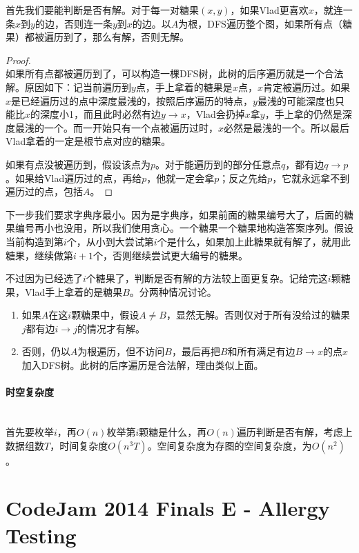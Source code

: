 \documentclass[UTF8]{ctexart}
\newcommand{\myparagraph}[1]{\paragraph{#1}\mbox{}\\}
\theoremstyle{nonumberplain}
\newtheorem{proof}{\hspace{1em}证明：}
\begin{document}
			首先我们要能判断是否有解。对于每一对糖果$(x,y)$，如果Vlad更喜欢$x$，就连一条$x$到$y$的边，否则连一条$y$到$x$的边。以$A$为根，DFS遍历整个图，如果所有点（糖果）都被遍历到了，那么有解，否则无解。
			
			\begin{proof}\mbox{}\\
			
				如果所有点都被遍历到了，可以构造一棵DFS树，此树的后序遍历就是一个合法解。原因如下：记当前遍历到$y$点，手上拿着的糖果是$x$点，$x$肯定被遍历过。如果$x$是已经遍历过的点中深度最浅的，按照后序遍历的特点，$y$最浅的可能深度也只能比$x$的深度小1，而且此时必然有边$y \to x$，Vlad会扔掉$x$拿$y$，手上拿的仍然是深度最浅的一个。而一开始只有一个点被遍历过时，$x$必然是最浅的一个。所以最后Vlad拿着的一定是根节点对应的糖果。
				
				如果有点没被遍历到，假设该点为$p$。对于能遍历到的部分任意点$q$，都有边$q \to p$。如果给Vlad遍历过的点，再给$p$，他就一定会拿$p$；反之先给$p$，它就永远拿不到遍历过的点，包括$A$。
				
			\end{proof}
			
			下一步我们要求字典序最小。因为是字典序，如果前面的糖果编号大了，后面的糖果编号再小也没用，所以我们使用贪心。一个糖果一个糖果地构造答案序列。假设当前构造到第$i$个，从小到大尝试第$i$个是什么，如果加上此糖果就有解了，就用此糖果，继续做第$i+1$个，否则继续尝试更大编号的糖果。
			
			不过因为已经选了$i$个糖果了，判断是否有解的方法较上面更复杂。记给完这$i$颗糖果，Vlad手上拿着的是糖果$B$。分两种情况讨论。
			
			\begin{enumerate}
				\item 如果$A$在这$i$颗糖果中，假设$A \not= B$，显然无解。否则仅对于所有没给过的糖果$j$都有边$i \to j$的情况才有解。
				\item 否则，仍以$A$为根遍历，但不访问$B$，最后再把$B$和所有满足有边$B \to x$的点$x$加入DFS树。此树的后序遍历是合法解，理由类似上面。
			\end{enumerate}
			
		\myparagraph{时空复杂度}
		
			首先要枚举$i$，再$O(n)$枚举第$i$颗糖是什么，再$O(n)$遍历判断是否有解，考虑上数据组数$T$，时间复杂度$O(n^3T)$。空间复杂度为存图的空间复杂度，为$O(n^2)$。
	
	\section{CodeJam 2014 Finals E - Allergy Testing}
	
\end{document}
